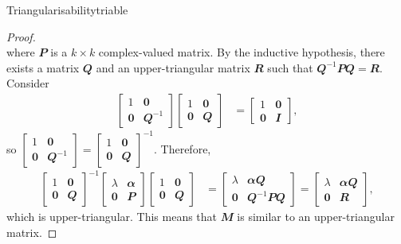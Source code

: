 \documentclass[math, code]{amznotes}
\theoremstyle{remark}
\newcommand{\zero}{\mathbf{0}}
\begin{document}
\begin{thmbox}{Triangularisability}{triable}
\begin{proof}
\begin{equation*}
        \end{equation*}
        where $\mathbfit{P}$ is a $k \times k$ complex-valued matrix. By the inductive hypothesis, there exists a matrix $\mathbfit{Q}$ and an upper-triangular matrix $\mathbfit{R}$ such that $\mathbfit{Q}^{-1}\mathbfit{PQ} = \mathbfit{R}$. Consider
        \begin{align*}
            \begin{bmatrix}
                1 & \zero \\
                \zero & \mathbfit{Q}^{-1}
            \end{bmatrix}\begin{bmatrix}
                1 & \zero \\
                \zero & \mathbfit{Q}
            \end{bmatrix} & = \begin{bmatrix}
                1 & \zero \\
                \zero & \mathbfit{I}
            \end{bmatrix},
        \end{align*}
        so $\left[\begin{smallmatrix}
            1 & \zero \\
                \zero & \mathbfit{Q}^{-1}
        \end{smallmatrix}\right] = \left[\begin{smallmatrix}
            1 & \zero \\
                \zero & \mathbfit{Q}
        \end{smallmatrix}\right]^{-1}$. Therefore,
        \begin{align*}
            \begin{bmatrix}
                1 & \zero \\
                \zero & \mathbfit{Q}
            \end{bmatrix}^{-1}\begin{bmatrix}
                \lambda & \mathbfit{\alpha} \\
                \zero & \mathbfit{P}
            \end{bmatrix}\begin{bmatrix}
                1 & \zero \\
                \zero & \mathbfit{Q}
            \end{bmatrix} & = \begin{bmatrix}
                \lambda & \mathbfit{\alpha}\mathbfit{Q}\\
                \zero & \mathbfit{Q}^{-1}\mathbfit{PQ}
            \end{bmatrix} = \begin{bmatrix}
                \lambda & \mathbfit{\alpha}\mathbfit{Q}\\
                \zero & \mathbfit{R}
            \end{bmatrix},
        \end{align*}
        which is upper-triangular. This means that $\mathbfit{M}$ is similar to an upper-triangular matrix.
    \end{proof}
\end{thmbox}
\end{document}
